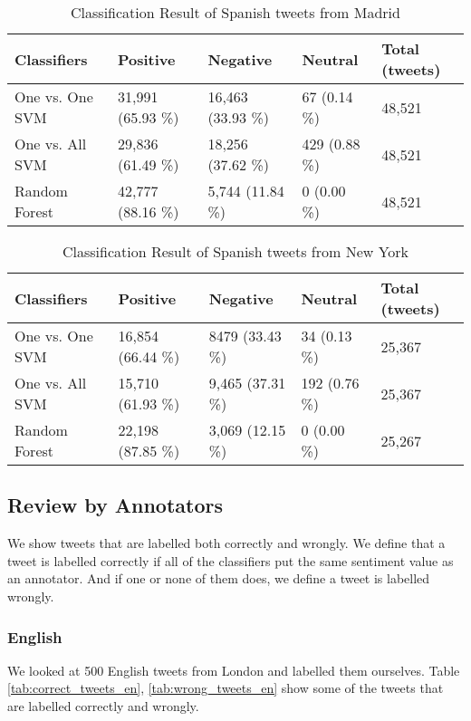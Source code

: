 \begin{table}[ht]
	\caption{Classification Result of Spanish tweets from Madrid}
	\begin{tabular}{|l|p{1.8cm}|p{1.8cm}|p{1.8cm}|p{1.8cm}|} \hline
	Classifiers & Positive & Negative & Neutral & Total (tweets)\\ \hline
One vs. One SVM & 31,991 (65.93 \%) & 16,463 (33.93 \%)& 67 (0.14 \%)& 48,521 \\ \hline
One vs. All SVM & 29,836 (61.49 \%)& 18,256 (37.62 \%)& 429 (0.88 \%)& 48,521 \\ \hline
Random Forest   & 42,777 (88.16 \%)& 5,744 (11.84 \%) & 0 (0.00 \%)  & 48,521 \\ \hline
	\end{tabular}
	\label{tab:result_madrid_es}
\end{table}

\begin{table}[ht]
	\caption{Classification Result of Spanish tweets from New York}
	\begin{tabular}{|l|p{1.8cm}|p{1.8cm}|p{1.8cm}|p{1.8cm}|} \hline
	Classifiers & Positive & Negative & Neutral & Total (tweets)\\ \hline
One vs. One SVM & 16,854 (66.44 \%)& 8479 (33.43 \%)& 34 (0.13 \%) & 25,367 \\ \hline
One vs. All SVM & 15,710 (61.93 \%)& 9,465 (37.31 \%)& 192 (0.76 \%)& 25,367 \\ \hline
Random Forest   & 22,198 (87.85 \%)& 3,069 (12.15 \%)& 0 (0.00 \%)  & 25,267 \\ \hline
	\end{tabular}
	\label{tab:result_ny_es}
\end{table}

\subsection{Review by Annotators}
We show tweets that are labelled both correctly and wrongly.
We define that a tweet is labelled correctly if all of the classifiers put the same sentiment value as an annotator.
And if one or none of them does, we define a tweet is labelled wrongly.
\subsubsection{English}
We looked at 500 English tweets from London and labelled them ourselves.
Table \ref{tab:correct_tweets_en}, \ref{tab:wrong_tweets_en} show some of the tweets that are labelled correctly and wrongly.


